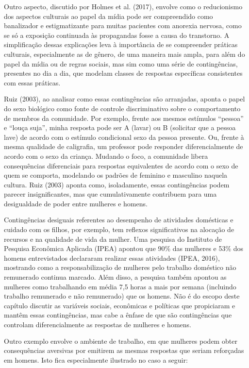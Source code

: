 Outro aspecto, discutido por Holmes et al. (2017), envolve como o reducionismo dos aspectos culturais ao papel da mídia pode ser compreendido como banalizador e estigmatizante para muitas pacientes com anorexia nervosa, como se só a exposição continuada às propagandas fosse a causa do transtorno. A simplificação dessas explicações leva à importância de se compreender práticas culturais, especialmente as de gênero, de uma maneira mais ampla, para além do papel da mídia ou de regras sociais, mas sim como uma série de contingências, presentes no dia a dia, que modelam classes de respostas específicas consistentes com essas práticas.

Ruiz (2003), ao analisar como essas contingências são arranjadas, aponta o papel do sexo biológico como fonte de controle discriminativo sobre o comportamento de membros da comunidade. Por exemplo, frente aos mesmos estímulos ``pessoa'' e ``louça suja'', minha resposta pode ser A (lavar) ou B (solicitar que a pessoa lave) de acordo com o estímulo condicional sexo da pessoa presente. Ou, frente à mesma qualidade de caligrafia, um professor pode responder diferencialmente de acordo com o sexo da criança. Mudando o foco, a comunidade libera consequências diferenciais para respostas equivalentes de acordo com o sexo de quem se comporta, modelando os padrões de feminino e masculino naquela cultura. Ruiz (2003) aponta como, isoladamente, essas contingências podem parecer insignificantes, mas que cumulativamente contribuem para uma desigualdade de poder entre mulheres e homens. 

Contingências desiguais referentes ao desempenho de atividades domésticas e cuidado com os filhos, por exemplo, tem reflexos significativos na alocação de recursos e na qualidade de vida da mulher. Uma pesquisa do Instituto de Pesquisa Econômica Aplicada (IPEA) apontou que 90\% das mulheres e 53\% dos homens entrevistados declararam realizar essas atividades (IPEA, 2016), mostrando como a responsabilização de mulheres pelo trabalho doméstico não remunerado continua marcado. Além disso, a pesquisa também apontou as mulheres como trabalhando em média 7,5 horas a mais por semana (incluindo trabalho remunerado e não remunerado) que os homens. Não é do escopo deste capítulo discutir as variáveis sociais, econômicas e políticas que propiciaram e mantêm essas contingências, mas cabe a ênfase de que são contingências que controlam diferencialmente as respostas de mulheres e homens.

Outro exemplo envolve o ambiente de trabalho, em que mulheres podem obter consequências aversivas por emitirem as mesmas respostas que seriam reforçadas em homens. Isto fica especialmente ilustrado no caso a seguir:

